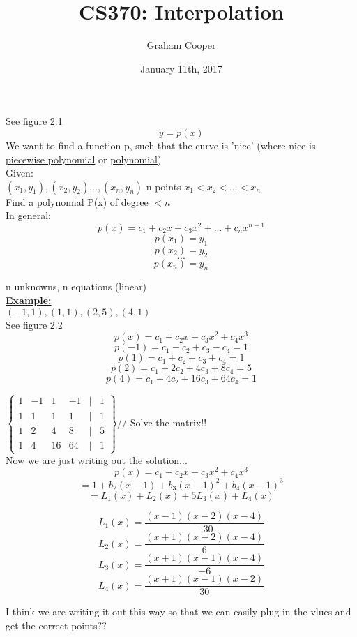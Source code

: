 \documentclass[12pt]{article}
\title{\vspace{-15ex}CS370: Interpolation \vspace{-1ex}}
\date{January 11th, 2017}
\author{Graham Cooper}
\newcommand{\myt}[1]{\textbf{\underline{#1}}}
\begin{document}
	\maketitle
	
	See figure 2.1\\
	
	$$y = p(x)$$
	We want to find a function p, such that the curve is 'nice' (where nice is \underline{piecewise polynomial} or \underline{polynomial})\\
	
	Given:\\
	$(x_1, y_1), (x_2,y_2)...,(x_n, y_n)$ n points $ x_1 < x_2 < ... < x_n$\\
	
	Find a polynomial P(x) of degree $< n$\\
	In general:\\
	$$p(x) = c_1 + c_2x + c_3x^2 + ... + c_nx^{n-1}$$
	$$p(x_1) = y_1$$
	$$p(x_2) = y_2$$
	$$...$$
	$$p(x_n) = y_n$$
	
	n unknowns, n equations (linear)\\
	
	\myt{Example:}\\
	$(-1, 1), (1,1), (2,5), (4,1)$\\
	See figure 2.2\\
	
	$$p(x) = c_1 + c_2x + c_3x^2 + c_4x^3$$
	$$p(-1) = c_1 - c_2 + c_3 - c_4 = 1$$
	$$p(1) = c_1 + c_2 + c_3 + c_4 = 1$$
	$$p(2) = c_1 + 2c_2 + 4c_3 + 8c_4 = 5$$
	$$p(4) = c_1 + 4c_2 + 16c_3 + 64c_4 = 1$$
	
	$
	\begin{Bmatrix}
		1 & -1 & 1 & -1 & | & 1 \\
		1 & 1 & 1 & 1 & | & 1 \\
		1 & 2 & 4 & 8 & | & 5 \\
		1 & 4 & 16 & 64 & | & 1
	\end{Bmatrix}
	$//
	Solve the matrix!!\\
	
	Now we are just writing out the solution...\\
	$$p(x) = c_1 + c_2x + c_3x^2 + c_4x^3$$
	$$= 1 + b_2(x-1)+b_3(x-1)^2+b_4(x-1)^3$$
	$$= L_1(x) + L_2(x) + 5L_3(x) + L_4(x)$$
	
	$$L_1(x) = \frac{(x-1)(x-2)(x-4)}{-30}$$
	$$L_2(x) = \frac{(x+1)(x-2)(x-4)}{6}$$
	$$L_3(x) = \frac{(x+1)(x-1)(x-4)}{-6}$$
	$$L_4(x) = \frac{(x+1)(x-1)(x-2)}{30}$$
	
	I think we are writing it out this way so that we can easily plug in the vlues and get the correct points??
	
\end{document}
